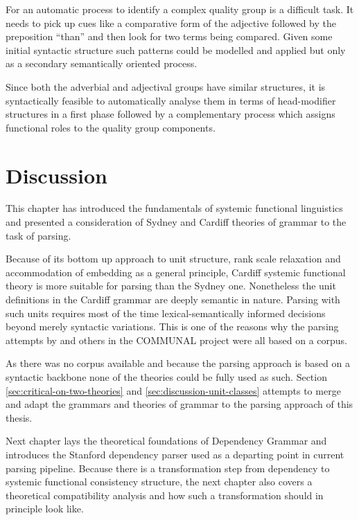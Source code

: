 	For an automatic process to identify a complex quality group is a difficult task. It needs to pick up cues like a comparative form of the adjective followed by the preposition ``than'' and then look for two terms being compared. Given some initial syntactic structure such patterns could be modelled and applied but only as a secondary semantically oriented process.
	
	Since both the adverbial and adjectival groups have similar structures, it is syntactically feasible to automatically analyse them in terms of head-modifier structures in a first phase followed by a complementary process which assigns functional roles to the quality group components.

\section{Discussion}

    This chapter has introduced the fundamentals of systemic functional linguistics and presented a consideration of Sydney and Cardiff theories of grammar to the task of parsing.
    
    Because of its bottom up approach to unit structure, rank scale relaxation and accommodation of embedding as a general principle, Cardiff systemic functional theory is more suitable for parsing than the Sydney one. Nonetheless the unit definitions in the Cardiff grammar are deeply semantic in nature. Parsing with such units requires most of the time lexical-semantically informed decisions beyond merely syntactic variations. This is one of the reasons why the parsing attempts by \citet{ODonoghue1991a} and others in the COMMUNAL project were all based on a corpus.
    
    As there was no corpus available and because the parsing approach is based on a syntactic backbone none of the theories could be fully used as such. Section \ref{sec:critical-on-two-theories} and \ref{sec:discussion-unit-classes} attempts to merge and adapt the grammars and theories of grammar to the parsing approach of this thesis.
    
    Next chapter lays the theoretical foundations of Dependency Grammar and introduces the Stanford dependency parser used as a departing point in current parsing pipeline. Because there is a transformation step from dependency to systemic functional consistency structure, the next chapter also covers a theoretical compatibility analysis and how such a transformation should in principle look like. 

